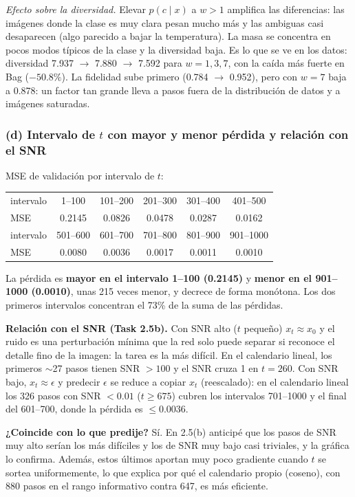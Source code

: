 \documentclass[11pt]{article}
\begin{document}
\emph{Efecto sobre la diversidad.} Elevar $p(c\mid x)$ a $w>1$ amplifica las diferencias: las imágenes donde la clase es muy clara pesan mucho más y las ambiguas casi desaparecen (algo parecido a bajar la temperatura). La masa se concentra en pocos modos típicos de la clase y la diversidad baja. Es lo que se ve en los datos: diversidad 7.937 $\rightarrow$ 7.880 $\rightarrow$ 7.592 para $w=1,3,7$, con la caída más fuerte en Bag ($-50.8\%$). La fidelidad sube primero (0.784 $\rightarrow$ 0.952), pero con $w=7$ baja a 0.878: un factor tan grande lleva a pasos fuera de la distribución de datos y a imágenes saturadas.

\subsubsection*{(d) Intervalo de $t$ con mayor y menor pérdida y relación con el SNR}
MSE de validación por intervalo de $t$:
\begin{table}[H]
\centering
\begin{tabular}{lccccc}
\toprule
intervalo & 1--100 & 101--200 & 201--300 & 301--400 & 401--500 \\
MSE & 0.2145 & 0.0826 & 0.0478 & 0.0287 & 0.0162 \\
\midrule
intervalo & 501--600 & 601--700 & 701--800 & 801--900 & 901--1000 \\
MSE & 0.0080 & 0.0036 & 0.0017 & 0.0011 & 0.0010 \\
\bottomrule
\end{tabular}
\end{table}

La pérdida es \textbf{mayor en el intervalo 1--100 (0.2145)} y \textbf{menor en el 901--1000 (0.0010)}, unas 215 veces menor, y decrece de forma monótona. Los dos primeros intervalos concentran el 73\% de la suma de las pérdidas.

\textbf{Relación con el SNR (Task 2.5b).} Con SNR alto ($t$ pequeño) $x_t\approx x_0$ y el ruido es una perturbación mínima que la red solo puede separar si reconoce el detalle fino de la imagen: la tarea es la más difícil. En el calendario lineal, los primeros $\sim$27 pasos tienen SNR $>100$ y el SNR cruza 1 en $t=260$. Con SNR bajo, $x_t\approx\epsilon$ y predecir $\epsilon$ se reduce a copiar $x_t$ (reescalado): en el calendario lineal los 326 pasos con SNR $<0.01$ ($t\ge675$) cubren los intervalos 701--1000 y el final del 601--700, donde la pérdida es $\le0.0036$.

\textbf{¿Coincide con lo que predije?} Sí. En 2.5(b) anticipé que los pasos de SNR muy alto serían los más difíciles y los de SNR muy bajo casi triviales, y la gráfica lo confirma. Además, estos últimos aportan muy poco gradiente cuando $t$ se sortea uniformemente, lo que explica por qué el calendario propio (coseno), con 880 pasos en el rango informativo contra 647, es más eficiente.
\end{document}
